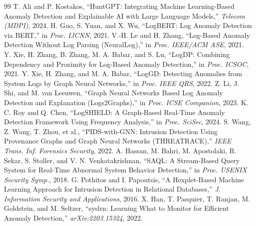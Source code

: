 \documentclass[conference]{IEEEtran}
\begin{document}
\begin{thebibliography}{99}
 T. Ali and P. Kostakos, ``HuntGPT: Integrating Machine Learning-Based Anomaly Detection and Explainable AI with Large Language Models,'' \emph{Telecom (MDPI)}, 2024.
 H. Guo, S. Yuan, and X. Wu, ``LogBERT: Log Anomaly Detection via BERT,'' in \emph{Proc. IJCNN}, 2021.
 V.-H. Le and H. Zhang, ``Log-Based Anomaly Detection Without Log Parsing (NeuralLog),'' in \emph{Proc. IEEE/ACM ASE}, 2021.
 Y. Xie, H. Zhang, B. Zhang, M. A. Babar, and S. Lu, ``LogDP: Combining Dependency and Proximity for Log-Based Anomaly Detection,'' in \emph{Proc. ICSOC}, 2021.
 Y. Xie, H. Zhang, and M. A. Babar, ``LogGD: Detecting Anomalies from System Logs by Graph Neural Networks,'' in \emph{Proc. IEEE QRS}, 2022.
 Z. Li, J. Shi, and M. van Leeuwen, ``Graph Neural Networks Based Log Anomaly Detection and Explanation (Logs2Graphs),'' in \emph{Proc. ICSE Companion}, 2023.
 K. C. Roy and Q. Chen, ``LogSHIELD: A Graph-Based Real-Time Anomaly Detection Framework Using Frequency Analysis,'' in \emph{Proc. SciSec}, 2024.
 S. Wang, Z. Wang, T. Zhou, et al., ``PIDS-with-GNN: Intrusion Detection Using Provenance Graphs and Graph Neural Networks (THREATRACE),'' \emph{IEEE Trans. Inf. Forensics Security}, 2022.
 A. Hassan, M. Bahri, M. Apostolaki, R. Sekar, S. Stoller, and V. N. Venkatakrishnan, ``SAQL: A Stream-Based Query System for Real-Time Abnormal System Behavior Detection,'' in \emph{Proc. USENIX Security Symp.}, 2018.
 G. Pothitos and I. Papoutsis, ``A Hexplet-Based Machine Learning Approach for Intrusion Detection in Relational Databases,'' \emph{J. Information Security and Applications}, 2016.
 X. Han, T. Pasquier, T. Ranjan, M. Goldstein, and M. Seltzer, ``syslrn: Learning What to Monitor for Efficient Anomaly Detection,'' \emph{arXiv:2203.15324}, 2022.

\end{thebibliography}
\end{document}
